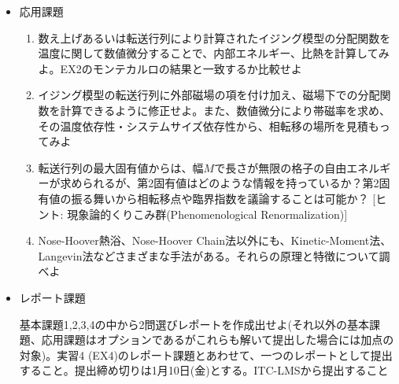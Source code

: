 \documentclass{jarticle}
\begin{document}
\begin{itemize}
\begin{enumerate}
  \end{enumerate}
\item 応用課題
  \begin{enumerate}
  \item 数え上げあるいは転送行列により計算されたイジング模型の分配関数を温度に関して数値微分することで、内部エネルギー、比熱を計算してみよ。EX2のモンテカルロの結果と一致するか比較せよ
  \item イジング模型の転送行列に外部磁場の項を付け加え、磁場下での分配関数を計算できるように修正せよ。また、数値微分により帯磁率を求め、その温度依存性・システムサイズ依存性から、相転移の場所を見積もってみよ
  \item 転送行列の最大固有値からは、幅$M$で長さが無限の格子の自由エネルギーが求められるが、第2固有値はどのような情報を持っているか？第2固有値の振る舞いから相転移点や臨界指数を議論することは可能か？ [ヒント: 現象論的くりこみ群(Phenomenological Renormalization)]
  \item Nose-Hoover熱浴、Nose-Hoover Chain法以外にも、Kinetic-Moment法、Langevin法などさまざまな手法がある。それらの原理と特徴について調べよ
  \end{enumerate}

\item レポート課題

基本課題1,2,3,4の中から2問選びレポートを作成出せよ(それ以外の基本課題、応用課題はオプションであるがこれらも解いて提出した場合には加点の対象)。実習4 (EX4)のレポート課題とあわせて、一つのレポートとして提出すること。提出締め切りは1月10日(金)とする。ITC-LMSから提出すること
\end{itemize}
\end{document}
